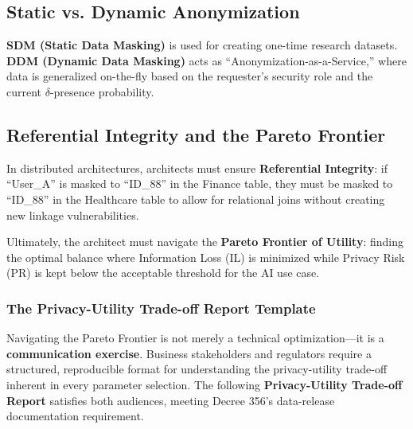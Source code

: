 \subsection{Static vs. Dynamic Anonymization}
\textbf{SDM (Static Data Masking)} is used for creating one-time research datasets. \textbf{DDM (Dynamic Data Masking)} acts as ``Anonymization-as-a-Service,'' where data is generalized on-the-fly based on the requester's security role and the current $\delta$-presence probability.

\subsection{Referential Integrity and the Pareto Frontier}
In distributed architectures, architects must ensure \textbf{Referential Integrity}: if ``User\_A'' is masked to ``ID\_88'' in the Finance table, they must be masked to ``ID\_88'' in the Healthcare table to allow for relational joins without creating new linkage vulnerabilities.

Ultimately, the architect must navigate the \textbf{Pareto Frontier of Utility}: finding the optimal balance where Information Loss (IL) is minimized while Privacy Risk (PR) is kept below the acceptable threshold for the AI use case.

\subsubsection{The Privacy-Utility Trade-off Report Template}
\label{subsubsec:pareto_template}

Navigating the Pareto Frontier is not merely a technical optimization---it is a \textbf{communication exercise}. Business stakeholders and regulators require a structured, reproducible format for understanding the privacy-utility trade-off inherent in every parameter selection. The following \textbf{Privacy-Utility Trade-off Report} satisfies both audiences, meeting Decree 356's data-release documentation requirement.

